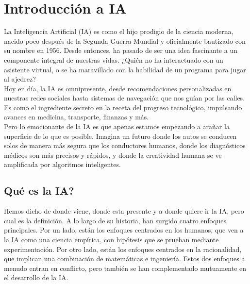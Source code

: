 \section{Introducción a IA}

La Inteligencia Artificial (IA) es como el hijo prodigio de la ciencia moderna, 
nacido poco después de la Segunda Guerra Mundial y oficialmente bautizado con su 
nombre en 1956. Desde entonces, ha pasado de ser una idea fascinante a un componente 
integral de nuestras vidas. ¿Quién no ha interactuado con un asistente virtual, 
o se ha maravillado con la habilidad de un programa para jugar al ajedrez? \\

Hoy en día, la IA es omnipresente, desde recomendaciones personalizadas en nuestras 
redes sociales hasta sistemas de navegación que nos guían por las calles. Es como 
el ingrediente secreto en la receta del progreso tecnológico, impulsando avances 
en medicina, transporte, finanzas y más. \\

Pero lo emocionante de la IA es que apenas estamos empezando a arañar la superficie 
de lo que es posible. Imagina un futuro donde los autos se conducen solos de manera 
más segura que los conductores humanos, donde los diagnósticos médicos son 
más precisos y rápidos, y donde la creatividad humana se ve amplificada 
por algoritmos inteligentes.


\subsection{Qué es la IA?}

Hemos dicho de donde viene, donde esta presente y a donde quiere ir la IA, pero cual 
es la definición. A lo largo de su historia, han surgido cuatro enfoques principales. 
Por un lado, están los enfoques centrados en los humanos, que ven a la IA como una 
ciencia empírica, con hipótesis que se prueban mediante experimentación. Por otro 
lado, están los enfoques centrados en la racionalidad, que implican una combinación 
de matemáticas e ingeniería. Estos dos enfoques a menudo entran en conflicto, 
pero también se han complementado mutuamente en el desarrollo de la IA.


